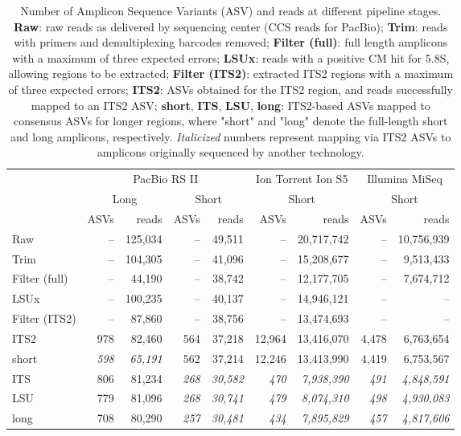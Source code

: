 \documentclass[
]{article}
\begin{document}
\begin{table}

\caption[Number of Amplicon Sequence Variants (ASV) and reads at different pipeline stages]{\label{tab:bioinfo}Number of Amplicon Sequence Variants (ASV) and reads at different pipeline stages. \textbf{Raw}: raw reads as delivered by sequencing center (CCS reads for PacBio);
\textbf{Trim}: reads with primers and demultiplexing barcodes removed;
\textbf{Filter (full)}: full length amplicons with a maximum of three expected errors;
\textbf{LSUx}: reads with a positive CM hit for 5.8S, allowing regions to be extracted;
\textbf{Filter (ITS2)}: extracted ITS2 regions with a maximum of three expected errors;
\textbf{ITS2}: ASVs obtained for the ITS2 region, and reads successfully mapped to an ITS2 ASV;
\textbf{short}, \textbf{ITS}, \textbf{LSU}, \textbf{long}: ITS2-based ASVs mapped to consensus ASVs for longer regions, where "short" and "long" denote the full-length short and long amplicons, respectively.
\emph{Italicized} numbers represent mapping via ITS2 ASVs to amplicons originally sequenced by another technology.}
\centering
\begin{tabular}[t]{lrrrrrrrr}
\toprule
\multicolumn{1}{c}{ } & \multicolumn{4}{c}{PacBio RS II} & \multicolumn{2}{c}{Ion Torrent Ion S5} & \multicolumn{2}{c}{Illumina MiSeq} \\
\cmidrule(l{3pt}r{3pt}){2-5} \cmidrule(l{3pt}r{3pt}){6-7} \cmidrule(l{3pt}r{3pt}){8-9}
\multicolumn{1}{c}{ } & \multicolumn{2}{c}{Long} & \multicolumn{2}{c}{Short} & \multicolumn{2}{c}{Short} & \multicolumn{2}{c}{Short} \\
\cmidrule(l{3pt}r{3pt}){2-3} \cmidrule(l{3pt}r{3pt}){4-5} \cmidrule(l{3pt}r{3pt}){6-7} \cmidrule(l{3pt}r{3pt}){8-9}
  & ASVs & reads & ASVs & reads & ASVs & reads & ASVs & reads\\
\midrule
Raw & – & 125,034 & – & 49,511 & – & 20,717,742 & – & 10,756,939\\
Trim & – & 104,305 & – & 41,096 & – & 15,208,677 & – & 9,513,433\\
Filter (full) & – & 44,190 & – & 38,742 & – & 12,177,705 & – & 7,674,712\\
\addlinespace
LSUx & – & 100,235 & – & 40,137 & – & 14,946,121 & – & –\\
Filter (ITS2) & – & 87,860 & – & 38,756 & – & 13,474,693 & – & –\\
ITS2 & 978 & 82,460 & 564 & 37,218 & 12,964 & 13,416,070 & 4,478 & 6,763,654\\
\addlinespace
short & \em{598} & \em{65,191} & 562 & 37,214 & 12,246 & 13,413,990 & 4,419 & 6,753,567\\
ITS & 806 & 81,234 & \em{268} & \em{30,582} & \em{470} & \em{7,938,390} & \em{491} & \em{4,848,591}\\
LSU & 779 & 81,096 & \em{268} & \em{30,741} & \em{479} & \em{8,074,310} & \em{498} & \em{4,930,083}\\
long & 708 & 80,290 & \em{257} & \em{30,481} & \em{434} & \em{7,895,829} & \em{457} & \em{4,817,606}\\
\bottomrule
\end{tabular}
\end{table}
\end{document}
